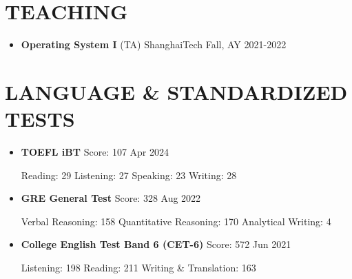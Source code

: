 \documentclass[a4paper,10pt]{ctexart} %
\begin{document}

\section{TEACHING}

    \begin{itemize}
        \item \textbf{Operating System I} (TA) \hfill ShanghaiTech \quad Fall, AY 2021-2022
    \end{itemize}



\section{LANGUAGE \& STANDARDIZED TESTS}

    \begin{itemize}
        \item \textbf{TOEFL iBT} \quad Score: 107 \hfill Apr 2024 \\
        \begin{small}
            Reading: 29 \quad Listening: 27 \quad Speaking: 23 \quad Writing: 28
        \end{small}
        \item \textbf{GRE General Test} \quad Score: 328 \hfill Aug 2022 \\
        \begin{small}
            Verbal Reasoning: 158 \quad Quantitative Reasoning: 170 \quad Analytical Writing: 4
        \end{small}
        \item \textbf{College English Test Band 6 (CET-6)} \quad Score: 572 \hfill Jun 2021 \\
        \begin{small}
            Listening: 198 \quad Reading: 211 \quad Writing \& Translation: 163
        \end{small}
    \end{itemize}


\end{document}
